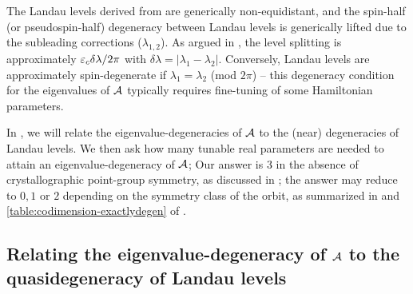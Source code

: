 \documentclass[aps, showpacs, twocolumn, notitlepage, superscriptaddress]{revtex4-1}
\begin{document}
The Landau levels derived from  are generically non-equidistant, and the spin-half (or pseudospin-half) degeneracy between Landau levels is generically lifted due to the subleading corrections ($\lambda_{1,2}$). As argued in , the level splitting is approximately $\varepsilon_c\delta \lambda/2\pi$ with $\delta \lambda=|\lambda_1-\lambda_2|$. Conversely, Landau levels are approximately spin-degenerate if $\lambda_1{=}\lambda_2$ (mod $2\pi$) -- this degeneracy condition for the eigenvalues of ${\cal A}$ typically requires fine-tuning of some Hamiltonian parameters.  

In , we will relate the eigenvalue-degeneracies of  ${\cal A}$ to the (near) degeneracies of Landau levels. We then ask how many tunable real parameters are needed to attain an eigenvalue-degeneracy of ${\cal A}$;  Our answer is  $3$ in the absence of crystallographic point-group symmetry, as discussed in ; the answer may reduce to $0,1$ or $2$ depending on the symmetry class of the orbit, as  summarized in  and \ref{table:codimension-exactlydegen} of .



\subsection{Relating the eigenvalue-degeneracy of ${\cal A}$ to the quasidegeneracy of Landau levels}\label{sec:relatedegeneracies}
\end{document}
